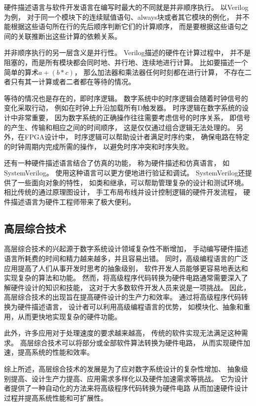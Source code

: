 硬件描述语言与软件开发语言在编写时最大的不同就是并非顺序执行。
以Verilog为例，
对于同一个模块下的连续赋值语句、always块或者其它模块的例化，
并不能根据这些语句所在行的先后顺序判断它们的计算顺序，
而是要根据这些语句之间的关联推断出这些计算的依赖关系。

并非顺序执行的另一层含义是并行性。
Verilog描述的硬件在计算过程中，
并不是阻塞的，而是所有模块都会同时地、并行地、连续地进行计算。
比如要描述一个简单的算术$a + (b * c)$，
那么加法器和乘法器任何时刻都在进行计算，
不存在二者只有其一计算或者二者都在等待的情况。

等待的情况也是存在的，即时序逻辑。
数字系统中的时序逻辑会随着时钟信号的变化采取行动，
例如在时钟上升沿加载所有D触发器。
时序逻辑在数字系统的设计中非常重要，
因为数字系统的正确操作往往需要考虑信号的时序关系，
即信号的产生、传输和相应之间的时间顺序，
这是仅仅通过组合逻辑无法处理的。
另外，在FPGA设计中，
时序逻辑可以帮助设计者满足时序约束，
确保电路在特定的时钟周期内完成所需的操作，
以避免时序冲突和时序失败。

还有一种硬件描述语言结合了仿真的功能，
称为硬件描述和仿真语言，
如SystemVerilog。
使用这种语言可以更方便地进行验证和调试。
SystemVerilog还提供了一些面向对象的特性，
如类和继承，可以帮助管理复杂的设计和测试环境。
相比传统的通过原理图设计，
手工布局布线并设计控制逻辑的硬件开发流程，
硬件描述语言为硬件工程师带来了极大便利。

\subsection{高层综合技术}

高层综合技术的兴起源于数字系统设计领域复杂性不断增加，
手动编写硬件描述语言所耗费的时间和精力越来越多，并且容易出错。
同时，高级编程语言的广泛应用提高了人们从事开发时思考的抽象级别，
软件开发人员能够更容易地表达和实现复杂的算法和功能。
然而，将高级程序代码转换为硬件电路通常需要深入了解硬件设计的知识和技能，
这对于大多数软件开发人员来说是一项挑战。
因此，高层综合技术的出现旨在提高硬件设计的生产力和效率。
通过将高级程序代码转换为硬件描述语言，
设计者可以利用高级编程语言的优势，
如模块化、抽象和重用，从而更快地实现复杂的硬件功能。

此外，许多应用对于处理速度的要求越来越高，
传统的软件实现无法满足这种需求。
高层综合技术可以将部分或全部软件算法转换为硬件电路，
从而实现硬件加速，提高系统的性能和效率。

综上所述，高层综合技术的发展是为了应对数字系统设计的复杂性增加、
抽象级别提高、设计生产力提高、应用需求多样化以及硬件加速需求等挑战。
它为设计者提供了一种自动化的方法来将高级程序代码转换为硬件电路
从而加速硬件设计过程并提高系统性能和可扩展性。

